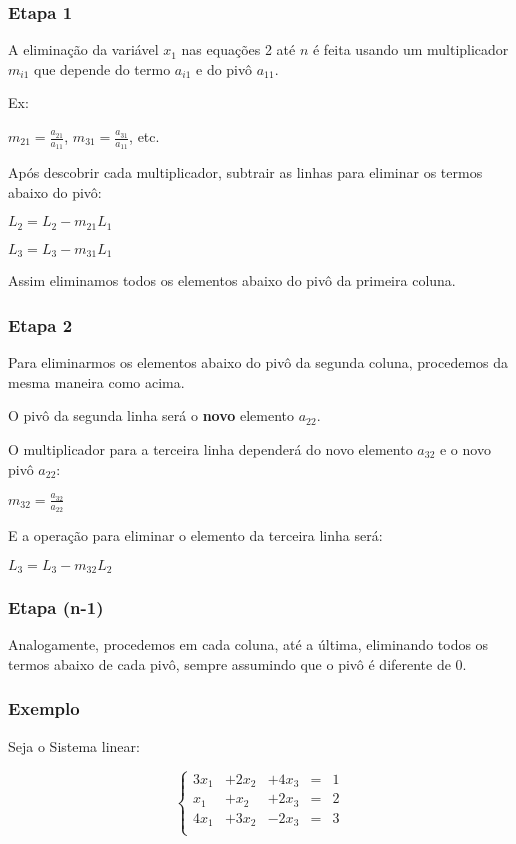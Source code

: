 \documentclass[a4paper]{article}
\begin{document}
\subsubsection*{Etapa 1}

A eliminação da variável $x_1$ nas equações 2 até $n$ é feita usando
um multiplicador $m_{i1}$ que depende do termo $a_{i1}$ e do pivô
$a_{11}$.

Ex: 

$m_{21} = \frac{a_{21}}{a_{11}}$, $m_{31} = \frac{a_{31}}{a_{11}}$, etc.

Após descobrir cada multiplicador, subtrair as linhas para eliminar os
termos abaixo do pivô:

$L_2 = L_2 - m_{21}L_1$

$L_3 = L_3 - m_{31}L_1$

Assim eliminamos todos os elementos abaixo do pivô da primeira coluna.

\subsubsection*{Etapa 2}

Para eliminarmos os elementos abaixo do pivô da segunda coluna,
procedemos da mesma maneira como acima.

O pivô da segunda linha será o {\bf novo} elemento $a_{22}$.

O multiplicador para a terceira linha dependerá do novo elemento
$a_{32}$ e o novo pivô $a_{22}$:

$m_{32} = \frac{a_{32}}{a_{22}}$

E a operação para eliminar o elemento da terceira linha será:

$L_3 = L_3 - m_{32}L_2$

\subsubsection*{Etapa (n-1)}

Analogamente, procedemos em cada coluna, até a última, eliminando
todos os termos abaixo de cada pivô, sempre assumindo que o pivô é
diferente de 0.

\subsubsection*{Exemplo}
Seja o Sistema linear:

\begin{displaymath}
  \left\{
  \begin{array}{ccccc}
    3x_1 &+ 2x_2 &+ 4x_3 &=&1\\
    x_1 &+ x_2 &+ 2x_3 &=& 2\\
    4x_1 &+ 3x_2 &- 2x_3 &=& 3\\
  \end{array}
\right.
\end{displaymath}
\end{document}
